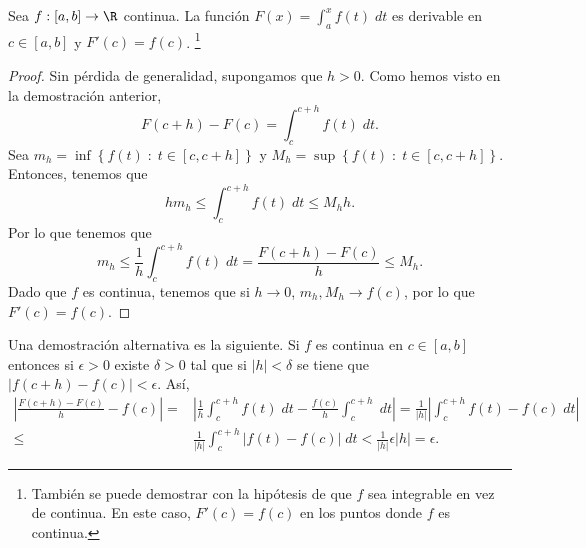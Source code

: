 \begin{ftheorem}
	\normalfont Sea $\displaystyle f : [a,b] \to \R$ continua. La función $\displaystyle F\left(x\right) = \int^{x}_{a} f\left(t\right) \; dt $ es derivable en $\displaystyle c \in \left[a,b\right]  $ y $\displaystyle F'\left(c\right) = f\left(c\right) $. \footnote{También se puede demostrar con la hipótesis de que $\displaystyle f $ sea integrable en vez de continua. En este caso, $\displaystyle F'\left(c\right) = f\left(c\right) $ en los puntos donde $\displaystyle f $ es continua.} 
\end{ftheorem}
\begin{proof}
Sin pérdida de generalidad, supongamos que $\displaystyle h > 0 $. Como hemos visto en la demostración anterior,
\[F\left(c + h\right)-F\left(c\right) = \int^{c + h}_{c} f\left(t\right) \; dt .\]
Sea $\displaystyle m_{h} = \inf \left\{ f\left(t\right) \; : \; t  \in \left[c, c + h\right]\right\}  $ y $\displaystyle M_{h} = \sup \left\{ f\left(t\right) \; : \; t \in \left[c, c+h\right]\right\}  $. Entonces, tenemos que
\[hm_{h} \leq \int^{c + h}_{c } f\left(t\right) \; dt \leq M_{h}h .\]
Por lo que tenemos que
\[m_{h} \leq \frac{1}{h}\int^{c+h}_{c} f\left(t\right) \; dt = \frac{F\left(c+h\right)-F\left(c\right)}{h} \leq M_{h} .\]
Dado que $\displaystyle f $ es continua, tenemos que si $\displaystyle h\to0 $, $\displaystyle m_{h}, M_{h} \to f\left(c\right) $, por lo que $\displaystyle F'\left(c\right) = f\left(c\right) $.
\end{proof}
\begin{observation}
	\normalfont Una demostración alternativa es la siguiente. Si $\displaystyle f $ es continua en $\displaystyle c \in \left[a,b\right]  $ entonces si $\displaystyle \epsilon > 0 $ existe $\displaystyle \delta > 0 $ tal que si $\displaystyle \left|h\right| < \delta  $ se tiene que $\displaystyle \left|f\left(c + h\right)-f\left(c\right)\right|<\epsilon  $. Así,
\[
\begin{split}
	\left|\frac{F\left(c+h\right)-F\left(c\right)}{h}-f\left(c\right)\right| = & \left|\frac{1}{h}\int^{c+h}_{c} f\left(t\right) \; dt - \frac{f\left(c\right)}{h}\int^{c+h}_{c}  \; dt\right| = \frac{1}{ \left|h\right|} \left|\int^{c+h}_{c} f\left(t\right)-f\left(c\right) \; dt\right|\\
	\leq & \frac{1}{ \left|h\right|}\int^{c+h}_{c} \left|f\left(t\right)-f\left(c\right)\right| \; dt < \frac{1}{ \left|h\right|} \epsilon \left|h\right| = \epsilon.
\end{split}
\]
	
\end{observation}
